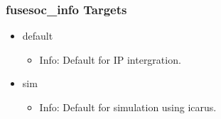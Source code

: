 \subsubsection{fusesoc\_info Targets}
\begin{itemize}
\item default
	\begin{itemize}
	\item[$\space$] Info: Default for IP intergration.
	\end{itemize}
\item sim
	\begin{itemize}
	\item[$\space$] Info: Default for simulation using icarus.
	\end{itemize}
\end{itemize}
